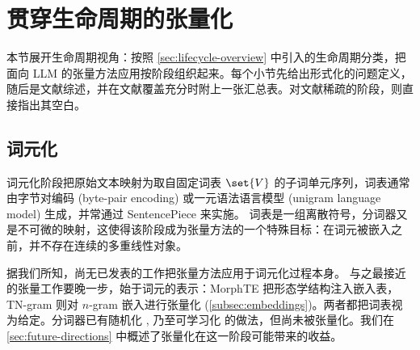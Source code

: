 \section{贯穿生命周期的张量化}
\label{sec:lifecycle-analysis}

本节展开生命周期视角：按照 \cref{sec:lifecycle-overview} 中引入的生命周期分类，把面向 LLM 的张量方法应用按阶段组织起来。每个小节先给出形式化的问题定义，随后是文献综述，并在文献覆盖充分时附上一张汇总表。对文献稀疏的阶段，则直接指出其空白。

\subsection{词元化}
\label{subsec:tokenization}

词元化阶段把原始文本映射为取自固定词表 $\set{V}$ 的子词单元序列，词表通常由字节对编码 (byte-pair encoding) \cite{sennrich2016bpe} 或一元语法语言模型 (unigram language model) \cite{kudo2018unigramlm} 生成，并常通过 SentencePiece \cite{kudo2018sentencepiece} 来实施。
词表是一组离散符号，分词器又是不可微的映射，这使得该阶段成为张量方法的一个特殊目标：在词元被嵌入之前，并不存在连续的多重线性对象。

据我们所知，尚无已发表的工作把张量方法应用于词元化过程本身。
与之最接近的张量工作要晚一步，始于词元的表示：MorphTE \cite{gan2022morphte} 把形态学结构注入嵌入表，TN-gram \cite{zhou2026tensorizingengram} 则对 $n$-gram 嵌入进行张量化 (\cref{subsec:embeddings})。两者都把词表视为给定。分词器已有随机化 \cite{kudo2018unigramlm}, \cite{provilkov2020bpedropout} 乃至可学习化 \cite{tay2022charformer} 的做法，但尚未被张量化。我们在 \cref{sec:future-directions} 中概述了张量化在这一阶段可能带来的收益。




